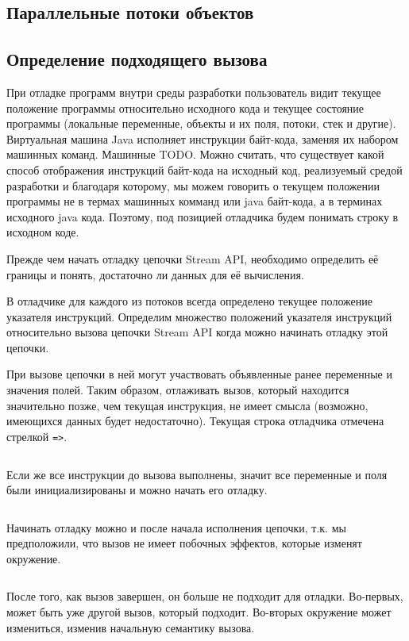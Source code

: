 \subsection{Параллельные потоки объектов}


\subsection{Определение подходящего вызова}
При отладке программ внутри среды разработки пользователь видит текущее положение программы относительно исходного кода и текущее состояние программы (локальные переменные, объекты и их поля, потоки, стек и другие). Виртуальная машина Java исполняет инструкции байт-кода, заменяя их набором машинных команд. Машинные TODO. Можно считать, что существует какой способ отображения инструкций байт-кода на исходный код, реализуемый средой разработки и благодаря которому, мы можем говорить о текущем положении программы не в термах машинных комманд или java байт-кода, а в терминах исходного java кода. Поэтому, под позицией отладчика будем понимать строку в исходном коде.

Прежде чем начать отладку цепочки Stream API, необходимо определить её границы и понять, достаточно ли данных для её вычисления.

В отладчике для каждого из потоков всегда определено текущее положение указателя инструкций.  Определим множество положений указателя инструкций относительно вызова цепочки Stream API когда можно начинать отладку этой цепочки. 

При вызове цепочки в ней могут участвовать объявленные ранее переменные и значения полей. Таким образом, отлаживать вызов, который находится значительно позже, чем текущая инструкция, не имеет смысла (возможно, имеющихся данных будет недостаточно). Текущая строка отладчика отмечена стрелкой \texttt{=>}.

\inputminted{java}{chapter2/code/FarToCall.java}

Если же все инструкции до вызова выполнены, значит все переменные и поля были инициализированы и можно начать его отладку. 

\inputminted{java}{chapter2/code/BeforeCall.java}

Начинать отладку можно и после начала исполнения цепочки, т.к. мы предположили, что вызов не имеет побочных эффектов, которые изменят окружение.
\inputminted{java}{chapter2/code/InEvaluation.java}

После того, как вызов завершен, он больше не подходит для отладки. Во-первых, может быть уже другой вызов, который подходит. Во-вторых окружение может измениться, изменив начальную семантику вызова.
\inputminted{java}{chapter2/code/AfterCall.java}


